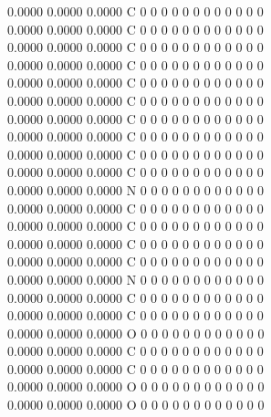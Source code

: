 \documentclass[11pt,titlepage,dvipdfmx,twoside]{article}
\begin{document}
\begin{oframed}
{    0.0000    0.0000    0.0000  C  0  0  0  0  0  0  0  0  0  0  0  0      \\
    0.0000    0.0000    0.0000  C  0  0  0  0  0  0  0  0  0  0  0  0      \\
    0.0000    0.0000    0.0000  C  0  0  0  0  0  0  0  0  0  0  0  0      \\
    0.0000    0.0000    0.0000  C  0  0  0  0  0  0  0  0  0  0  0  0      \\
    0.0000    0.0000    0.0000  C  0  0  0  0  0  0  0  0  0  0  0  0      \\
    0.0000    0.0000    0.0000  C  0  0  0  0  0  0  0  0  0  0  0  0      \\
    0.0000    0.0000    0.0000  C  0  0  0  0  0  0  0  0  0  0  0  0      \\
    0.0000    0.0000    0.0000  C  0  0  0  0  0  0  0  0  0  0  0  0      \\
    0.0000    0.0000    0.0000  C  0  0  0  0  0  0  0  0  0  0  0  0      \\
    0.0000    0.0000    0.0000  C  0  0  0  0  0  0  0  0  0  0  0  0      \\
    0.0000    0.0000    0.0000  N  0  0  0  0  0  0  0  0  0  0  0  0      \\
    0.0000    0.0000    0.0000  C  0  0  0  0  0  0  0  0  0  0  0  0      \\
    0.0000    0.0000    0.0000  C  0  0  0  0  0  0  0  0  0  0  0  0      \\
    0.0000    0.0000    0.0000  C  0  0  0  0  0  0  0  0  0  0  0  0      \\
    0.0000    0.0000    0.0000  C  0  0  0  0  0  0  0  0  0  0  0  0      \\
    0.0000    0.0000    0.0000  N  0  0  0  0  0  0  0  0  0  0  0  0      \\
    0.0000    0.0000    0.0000  C  0  0  0  0  0  0  0  0  0  0  0  0      \\
    0.0000    0.0000    0.0000  C  0  0  0  0  0  0  0  0  0  0  0  0      \\
    0.0000    0.0000    0.0000  O  0  0  0  0  0  0  0  0  0  0  0  0      \\
    0.0000    0.0000    0.0000  C  0  0  0  0  0  0  0  0  0  0  0  0      \\
    0.0000    0.0000    0.0000  C  0  0  0  0  0  0  0  0  0  0  0  0      \\
    0.0000    0.0000    0.0000  O  0  0  0  0  0  0  0  0  0  0  0  0      \\
    0.0000    0.0000    0.0000  O  0  0  0  0  0  0  0  0  0  0  0  0      \\
}
\end{oframed}
\end{document}
